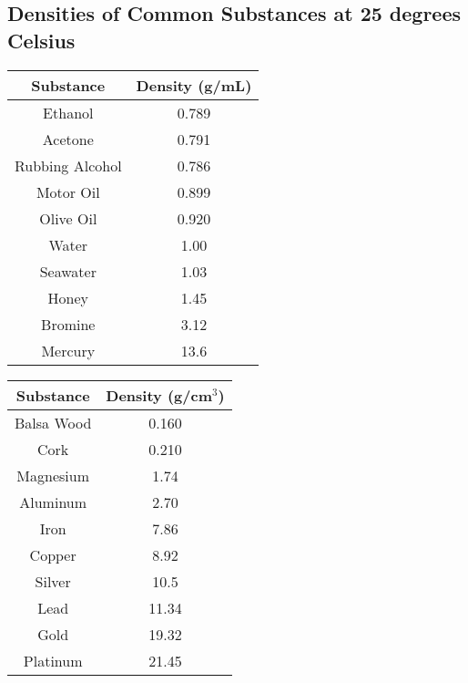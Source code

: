 \begin{minipage}{\textwidth}

\subsection{Densities of Common Substances at 25 degrees Celsius}

\begin{multicols}{2}
\begin{table}[H]
\centering
\begin{tabular}{|c|c|}
\hline
Substance & Density (g/mL) \\
\hline
Ethanol & 0.789 \\
\hline
Acetone & 0.791 \\
\hline
Rubbing Alcohol & 0.786 \\
\hline
Motor Oil & 0.899 \\
\hline
Olive Oil & 0.920 \\
\hline
Water & 1.00 \\
\hline
Seawater & 1.03 \\
\hline
Honey & 1.45 \\
\hline
Bromine & 3.12 \\
\hline
Mercury & 13.6 \\
\hline
\end{tabular}
\end{table}

\begin{table}[H]
\centering
\begin{tabular}{|c|c|}
\hline
Substance & Density (g/cm$^{3}$) \\
\hline
Balsa Wood & 0.160 \\
\hline
Cork & 0.210 \\
\hline
Magnesium & 1.74 \\
\hline
Aluminum & 2.70 \\
\hline
Iron & 7.86 \\
\hline
Copper & 8.92 \\
\hline
Silver & 10.5 \\
\hline
Lead & 11.34 \\
\hline
Gold & 19.32 \\
\hline
Platinum & 21.45 \\
\hline
\end{tabular}
\end{table}
\end{multicols}

\end{minipage}

